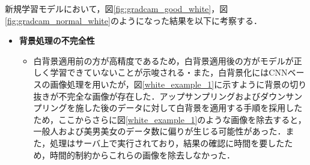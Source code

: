 \documentclass[a4paper,11pt,titlepage]{jsarticle}
\begin{document}
新規学習モデルにおいて，図\ref{fig:gradcam_good_white}，図\ref{fig:gradcam_normal_white}のようになった結果を以下に考察する．
\begin{itemize}
  \item \textbf{背景処理の不完全性}
    \begin{itemize}
      \item 白背景適用前の方が高精度であるため，白背景適用後の方がモデルが正しく学習できていないことが示唆される・また，白背景化にはCNNベースの画像処理を用いたが，図\ref{white_example_1}に示すように背景の切り抜きが不完全な画像が存在した．アップサンプリングおよびダウンサンプリングを施した後のデータに対して白背景を適用する手順を採用したため，ここからさらに図\ref{white_example_1}のような画像を除去すると，一般人および美男美女のデータ数に偏りが生じる可能性があった．また，処理はサーバ上で実行されており，結果の確認に時間を要したため，時間的制約からこれらの画像を除去しなかった．
    \end{itemize}


\end{itemize}
\end{document}
